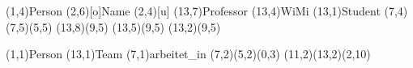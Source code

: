 \documentclass[11pt,a4paper]{article}
\begin{document}
\begin{schema}
  \entity(1,4){Person}
  \attr(2,6)[o]{Name}
  \attr(2,4)[u]{}
  \relation(13,7){Professor}
  \relation(13,4){WiMi}
  \relation(13,1){Student}
  \cluster(7,4)
  \conn(7,5)(5,5){}
  \conn(13,8)(9,5){}
  \conn(13,5)(9,5){}
  \conn(13,2)(9,5){}
\end{schema}

\begin{schema}
  \entity(1,1){Person}
  \entity(13,1){Team}
  \relation(7,1){arbeitet\_in}
  \conn(7,2)(5,2){(0,3)}
  \conn(11,2)(13,2){(2,10)}
\end{schema}
\end{document}
